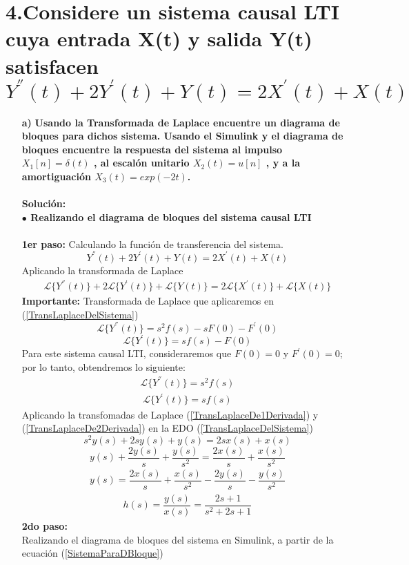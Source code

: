 \documentclass[11pt,a4paper]{article}
\begin{document}
	\section{{\large 4.Considere un sistema causal LTI cuya entrada X(t) y salida Y(t) satisfacen $$Y^{''}(t)+2Y^{'}(t)+Y(t)=2X^{'}(t)+X(t)$$}}{
	\large{
	\begin{enumerate}
	\item[\textbf{a)}]
	\textbf{Usando la Transformada de Laplace encuentre un diagrama de bloques para dichos sistema. Usando el Simulink y el diagrama de bloques encuentre la respuesta del sistema al impulso $X_{1}[n]=\delta(t)$ , al escalón unitario $X_{2}(t)=u[n]$ , y a la amortiguación $X_{3}(t)=exp(-2t)$.}\\\\
	\textbf{Solución:}\\
	\textbf{$\bullet$ Realizando el diagrama de bloques del sistema causal LTI }\\\\
	\textbf{1er paso:} Calculando la función de transferencia del sistema.
	$$Y^{''}(t)+2Y^{'}(t)+Y(t)=2X^{'}(t)+X(t)$$
Aplicando la transformada de Laplace
	\begin{eqnarray}
	\label{TransLaplaceDelSistema}
		\mathcal{L}{\lbrace Y^{''}(t)\rbrace}+2 \mathcal{L}{ \lbrace Y^{'}(t)\rbrace}+ \mathcal{L}{ \lbrace Y(t)\rbrace }=2 \mathcal{L}{\lbrace X^{'}(t)\rbrace}+ \mathcal{L}{ \lbrace X(t) \rbrace}
	\end{eqnarray}
	\textbf{Importante:} Transformada de Laplace que aplicaremos en (\ref{TransLaplaceDelSistema})\\ 
	$$\mathcal{L}{\lbrace Y^{''}(t)\rbrace}=s^2f(s)-sF(0)-F^{'}(0)$$
	$$\mathcal{L}{ \lbrace Y^{'}(t)\rbrace}=sf(s)-F(0)$$
	Para este sistema causal LTI, consideraremos que $F(0)=0$ y $F^{'}(0)=0$; por lo tanto, obtendremos lo siguiente:
	\begin{eqnarray}
	\label{TransLaplaceDe2Derivada}
		\mathcal{L}{\lbrace Y^{''}(t)\rbrace}=s^2f(s)
	\end{eqnarray}
	\begin{eqnarray}
	\label{TransLaplaceDe1Derivada}
		\mathcal{L}{ \lbrace Y^{'}(t)\rbrace}=sf(s)
	\end{eqnarray}
	Aplicando la transfomadas de Laplace (\ref{TransLaplaceDe1Derivada})
y (\ref{TransLaplaceDe2Derivada}) en la EDO (\ref{TransLaplaceDelSistema})
	$$s^2y(s)+2sy(s)+y(s)=2sx(s)+x(s)$$
	$$y(s)+ \dfrac{2y(s)}{s}+ \dfrac{y(s)}{s^2}= \dfrac{2x(s)}{s}+ \dfrac{x(s)}{s^2}$$
	\begin{eqnarray}
	\label{SistemaParaDBloque}
		y(s)= \dfrac{2x(s)}{s}+ \dfrac{x(s)}{s^2}- \dfrac{2y(s)}{s}- \dfrac{y(s)}{s^2}
	\end{eqnarray}
	\begin{eqnarray}
	\label{Función transferencia4}
	\boxed{h(s)=\dfrac{y(s)}{x(s)}=\dfrac{2s+1}{s^2 +2s+1}}
	\end{eqnarray}
	\newpage
\textbf{2do paso:}\\
Realizando el diagrama de bloques del sistema en Simulink, a partir de la ecuación (\ref{SistemaParaDBloque})
	

\end{enumerate}}}
\end{document}

